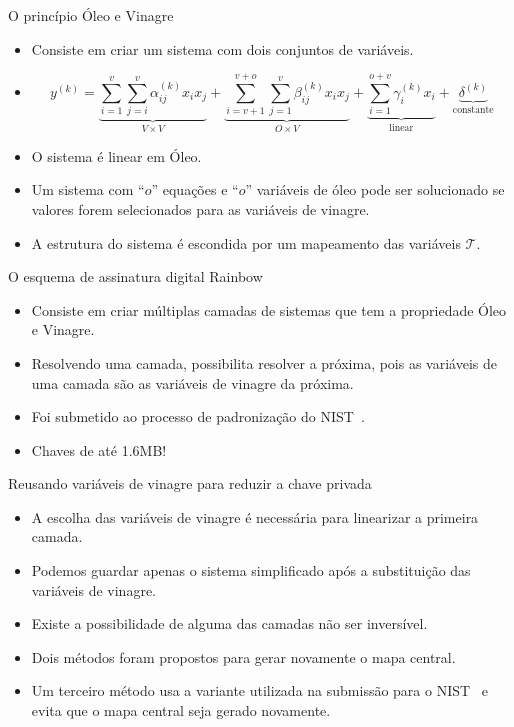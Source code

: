 \documentclass[]{beamer}
\begin{document}
\begin{frame}{O princípio Óleo e Vinagre~\cite{patarin1997ov}}
	\begin{itemize}[<+->]
		\item Consiste em criar um sistema com dois conjuntos de variáveis.
		\item \begin{equation*}\label{eq:ovpolynomial}
			y^{(k)} =
			\underbrace{
				\sum_{i=1}^{v}\sum_{j=i}^{v} \alpha^{(k)}_{ij} x_i x_j}_{
			V \times V} +
			\underbrace{
				\sum_{i=v+1}^{v+o}\sum_{j=1}^{v} \beta^{(k)}_{ij} x_i x_j}_{
			O \times V} +
			\underbrace{
				\sum_{i=1}^{o+v} \gamma^{(k)}_{i} x_i}_{\text{linear}} +
			\underbrace{\delta^{(k)}}_{\text{constante}}
		\end{equation*}
		\item O sistema é linear em Óleo.
		\item Um sistema com ``$o$'' equações e ``$o$'' variáveis de óleo pode
		ser solucionado se valores forem selecionados para as variáveis de
		vinagre.
		\item A estrutura do sistema é escondida por um mapeamento das
		variáveis $\mathcal{T}$.
	\end{itemize}
\end{frame}

\begin{frame}{O esquema de assinatura digital Rainbow~\cite{ding2005rainbow}}
	\begin{itemize}[<+->]
		\item Consiste em criar múltiplas camadas de sistemas que tem a
		propriedade Óleo e Vinagre.
		\item Resolvendo uma camada, possibilita resolver a próxima, pois as
		variáveis de uma camada são as variáveis de vinagre da próxima.
		\item Foi submetido ao processo de padronização do
		NIST~\cite{ding2017nist}.
		\item Chaves de até 1.6MB!
	\end{itemize}
\end{frame}

\begin{frame}{Reusando variáveis de vinagre para reduzir a chave privada}
	\begin{itemize}[<+->]
		\item A escolha das variáveis de vinagre é necessária para linearizar a
		primeira camada.
		\item Podemos guardar apenas o sistema simplificado após a substituição
		das variáveis de vinagre.
		\item Existe a possibilidade de alguma das camadas não ser inversível.
		\item Dois métodos foram propostos para gerar novamente o mapa central.
		\item Um terceiro método usa a variante utilizada na submissão para o
		NIST~\cite{ding2017nist} e evita que o mapa central seja gerado
		novamente.
	\end{itemize}
\end{frame}
\end{document}
